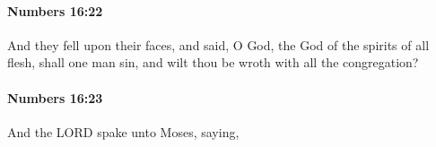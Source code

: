 		\paragraph{Numbers 16:22} %
			\label{NUMBERS-16-22}

			And they fell upon their faces, and said, O God, the God of the spirits of all flesh, shall one man sin, and wilt thou be wroth with all the congregation?


		\paragraph{Numbers 16:23} %
			\label{NUMBERS-16-23}

			And the LORD spake unto Moses, saying,


